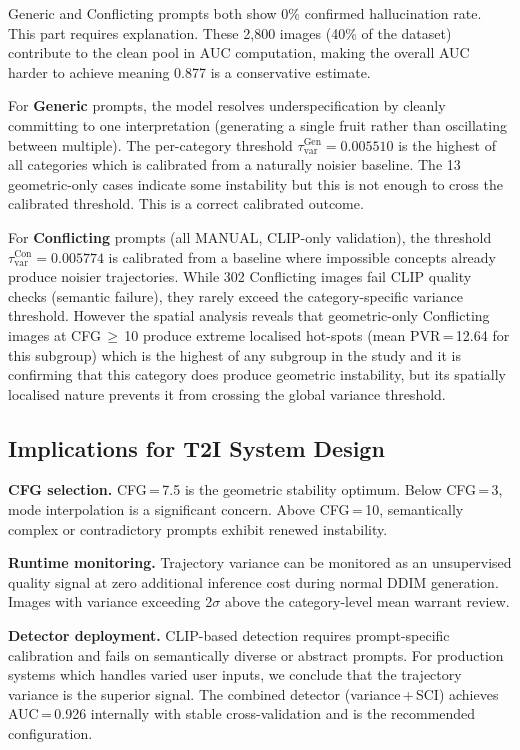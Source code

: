 \documentclass[conference]{IEEEtran}
\begin{document}
Generic and Conflicting prompts both show 0\% confirmed hallucination
rate. This part requires explanation. These 2{,}800 images (40\% of the
dataset) contribute to the clean pool in AUC computation, making the
overall AUC harder to achieve meaning 0.877 is a conservative estimate.

For \textbf{Generic} prompts, the model resolves underspecification
by cleanly committing to one interpretation (generating a single fruit
rather than oscillating between multiple). The per-category threshold
$\tau_\text{var}^\text{Gen}{=}0.005510$ is the highest of all
categories which is calibrated from a naturally noisier baseline. The 13
geometric-only cases indicate some instability but this is not enough to
cross the calibrated threshold. This is a correct calibrated outcome.

For \textbf{Conflicting} prompts (all MANUAL, CLIP-only validation),
the threshold $\tau_\text{var}^\text{Con}{=}0.005774$ is calibrated
from a baseline where impossible concepts already produce noisier
trajectories. While 302 Conflicting images fail CLIP quality checks
(semantic failure), they rarely exceed the category-specific variance
threshold. However the spatial analysis reveals that geometric-only
Conflicting images at CFG\,${\geq}$\,10 produce extreme localised
hot-spots (mean PVR\,=\,12.64 for this subgroup) which is the highest of any
subgroup in the study and it is confirming that this category does produce
geometric instability, but its spatially localised nature prevents it
from crossing the global variance threshold.

\subsection{Implications for T2I System Design}

\textbf{CFG selection.} CFG\,=\,7.5 is the geometric stability
optimum. Below CFG\,=\,3, mode interpolation is a significant concern.
Above CFG\,=\,10, semantically complex or contradictory prompts exhibit
renewed instability.

\textbf{Runtime monitoring.} Trajectory variance can be monitored as
an unsupervised quality signal at zero additional inference cost during
normal DDIM generation. Images with variance exceeding 2$\sigma$ above
the category-level mean warrant review.

\textbf{Detector deployment.} CLIP-based detection requires
prompt-specific calibration and fails on semantically diverse or
abstract prompts. For production systems which handles varied user inputs, we conclude that the
trajectory variance is the superior signal. The combined detector
(variance\,+\,SCI) achieves AUC\,=\,0.926 internally with stable
cross-validation and is the recommended configuration.
\end{document}
